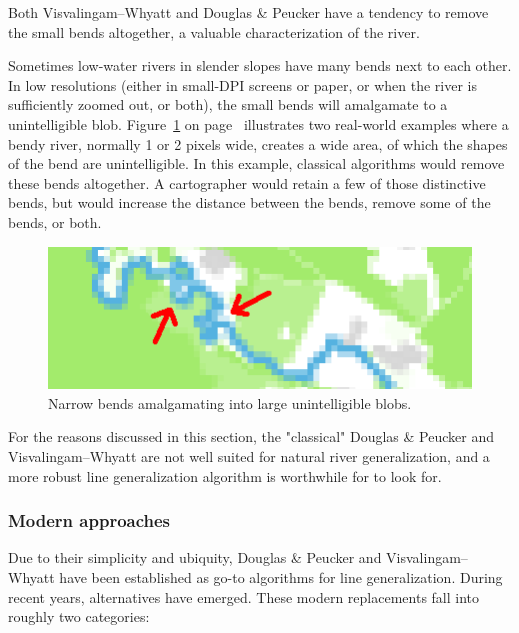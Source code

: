 \documentclass[a4paper]{article}
\newcommand{\onpage}[1]{\ref{#1} on page~\pageref{#1}}
\newcommand{\DP}{Douglas \& Peucker}
\newcommand{\VW}{Visvalingam--Whyatt}
\begin{document}
Both {\VW} and {\DP} have a tendency to remove the small bends altogether, a
valuable characterization of the river.

Sometimes low-water rivers in slender slopes have many bends next to each
other. In low resolutions (either in small-DPI screens or paper, or when the
river is sufficiently zoomed out, or both), the small bends will amalgamate to
a unintelligible blob. Figure~\onpage{fig:pixel-amalgamation} illustrates two
real-world examples where a bendy river, normally 1 or 2 pixels wide, creates a
wide area, of which the shapes of the bend are unintelligible. In this example,
classical algorithms would remove these bends altogether. A cartographer would
retain a few of those distinctive bends, but would increase the distance
between the bends, remove some of the bends, or both.

\begin{figure}[ht]
    \includegraphics[width=\textwidth]{amalgamate1}
    \caption{Narrow bends amalgamating into large unintelligible blobs.}
    \label{fig:pixel-amalgamation}
\end{figure}

For the reasons discussed in this section, the "classical" {\DP} and {\VW} are
not well suited for natural river generalization, and a more robust line
generalization algorithm is worthwhile for to look for.

\subsubsection{Modern approaches}


Due to their simplicity and ubiquity, {\DP} and {\VW} have been established as
go-to algorithms for line generalization. During recent years, alternatives
have emerged. These modern replacements fall into roughly two categories:
\end{document}
